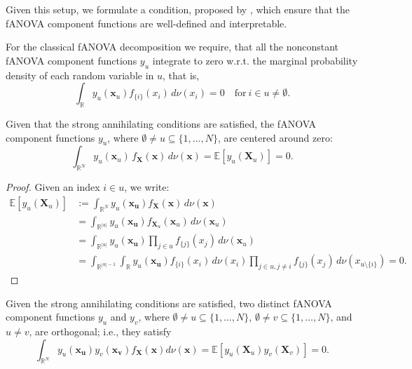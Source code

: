 Given this setup, we formulate a condition, proposed by \cite{rahman2014}, which ensure that the fANOVA component functions are well-defined and interpretable.
\begin{condition}\label{cond:strong_annihilating_conditions}
    For the classical fANOVA decomposition we require, that all the nonconstant fANOVA component functions $y_u$ integrate to zero w.r.t. the marginal probability density of each random variable in $u$, that is,
\begin{equation}
    \int_{\mathbb{R}} y_u(\boldsymbol{x}_u) f_{\{i\}}(x_i) \, d\nu(x_i) = 0 \quad \text{for} \ i \in u \neq \emptyset.
\end{equation}
\end{condition}

\begin{proposition}\label{prop:zero_mean_classical}
Given that the strong annihilating conditions are satisfied, 
the fANOVA component functions $y_u$, where 
$\emptyset \neq u \subseteq \{1,\dots,N\}$, are centered around zero:
\begin{equation}
    \int_{\mathbb{R}^N} 
        y_u(\boldsymbol{x}_u)\, f_{\boldsymbol{X}}(\boldsymbol{x}) 
        \, d\nu (\boldsymbol{x})
    = \mathbb{E}[y_u(\boldsymbol{X}_u)] 
    = 0.
\end{equation}
\end{proposition}

\begin{proof}
    Given an index $i \in u$, we write:
\begin{align*}
    \mathbb{E}[y_u(\boldsymbol{X}_u)] &:= \int_{\mathbb{R}^{N}} y_u(\boldsymbol{x_u}) f_{\boldsymbol{X}}(\boldsymbol{x}) \, d\nu (\boldsymbol{x}) \\[0.5em]
    &= \int_{\mathbb{R}^{|u|}} y_u(\boldsymbol{x_u}) f_{\boldsymbol{X}_u}(\boldsymbol{x}_u) \, d\nu (\boldsymbol{x}_u) \\[0.5em]
    &= \int_{\mathbb{R}^{|u|}} y_u(\boldsymbol{x_u}) \prod_{j \in u} f_{\{j\}}(x_j) \, d\nu (\boldsymbol{x}_u) \\[0.5em]
    &= \int_{\mathbb{R}^{|u|-1}} \int_{\mathbb{R}} y_u(\boldsymbol{x_u}) f_{\{i\}}(x_i) \, d\nu(x_i) \prod_{j \in u, j \neq i} f_{\{j\}}(x_j) \, d\nu (x_{u \setminus \{i\}}) = 0.
\end{align*}
\end{proof}

\begin{proposition}\label{prop:orthogonality_classical}
    Given the strong annihilating conditions are satisfied, two distinct fANOVA component functions $y_u$ and $y_v$, where $\emptyset \neq u \subseteq \{1,\ldots,N\}$, $\emptyset \neq v \subseteq \{1,\ldots,N\}$, and $u \neq v$, are orthogonal; i.e., they satisfy
\begin{equation}
    \int_{\mathbb{R}^N} y_u(\boldsymbol{x_u}) y_v(\boldsymbol{x_v}) f_{\boldsymbol{X}}(\boldsymbol{x}) d\nu (\boldsymbol{x}) = \mathbb{E}[y_u(\boldsymbol{X}_u) y_v(\boldsymbol{X}_v)] = 0.
\end{equation}
\end{proposition}

